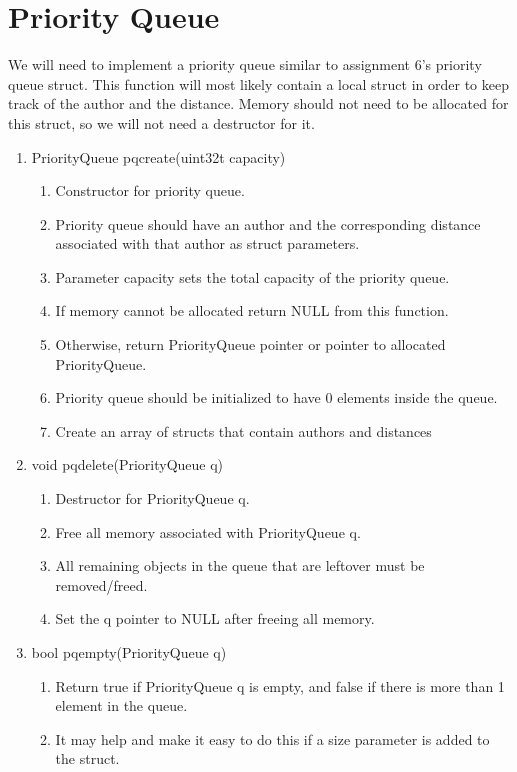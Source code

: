 \documentclass[11pt]{article}
\begin{document}
\section{Priority Queue}\label{ss:pq}
We will need to implement a priority queue similar to assignment 6's priority queue struct.
This function will most likely contain a local struct in order to keep track of the author and the distance. Memory should not need to be allocated for this struct, so we will not need a destructor for it.
\begin{enumerate}
\item PriorityQueue pqcreate(uint32t capacity)
	\begin{enumerate}
	\item Constructor for priority queue.
	\item Priority queue should have an author and the corresponding distance associated with that author as struct parameters.
	\item Parameter capacity sets the total capacity of the priority queue.
	\item If memory cannot be allocated return NULL from this function.
	\item Otherwise, return PriorityQueue pointer or pointer to allocated PriorityQueue.
	\item Priority queue should be initialized to have 0 elements inside the queue.
	\item Create an array of structs that contain authors and distances
	\end{enumerate}
\item void pqdelete(PriorityQueue q)
	\begin{enumerate}
	\item Destructor for PriorityQueue q.
	\item Free all memory associated with PriorityQueue q.
	\item All remaining objects in the queue that are leftover must be removed/freed.
	\item Set the q pointer to NULL after freeing all memory.
	\end{enumerate}
\item bool pqempty(PriorityQueue q)
	\begin{enumerate}
	\item Return true if PriorityQueue q is empty, and false if there is more than 1 element in the queue.
	\item It may help and make it easy to do this if a size parameter is added to the struct.
	\end{enumerate}

\end{enumerate}
\end{document}

